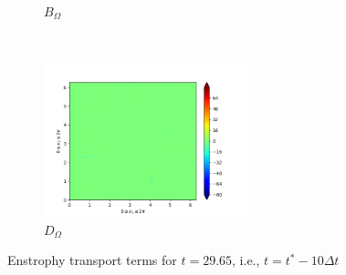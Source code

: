 \begin{figure}[H]
\begin{subfigure}{0.45\textwidth}
        \caption{$B_{\Omega}$}
    \end{subfigure}
    ~
    \begin{subfigure}{0.45\textwidth}
        \includegraphics[height=1.75in]{media/run-cds-65/D-enst-1330.png}
        \caption{$D_{\Omega}$}
    \end{subfigure}
    \caption{Enstrophy transport terms for $t=29.65$, i.e., $t=t^{\ast} - 10 \Delta t$}
    \label{fig:enst-1330.png}
\end{figure}

\newpage

